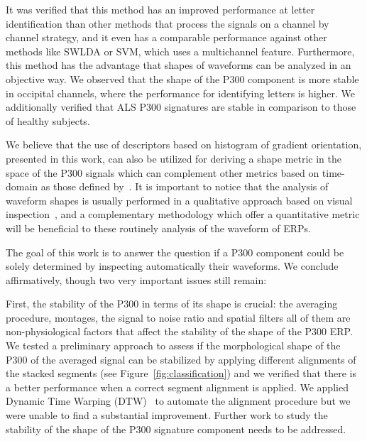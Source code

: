 \documentclass[utf8]{frontiersSCNS} %
\begin{document}

It was verified that this method has an improved performance at letter identification than other methods that process the signals on a channel by channel strategy, and it even has a comparable performance against other methods like SWLDA or SVM, which uses a multichannel feature.
Furthermore, this method has the advantage that shapes of waveforms can be analyzed in an objective way.  We observed that the shape of the P300 component is more stable in occipital channels, where the performance for identifying letters is higher.   We additionally verified that ALS P300 signatures are stable in comparison to those of healthy subjects.


We believe that the use of descriptors based on histogram of gradient orientation, presented in this work, can also be utilized for deriving a shape metric in the space of the P300 signals which can complement other metrics based on time-domain as those defined by~\cite{Mak2012}. It is important to notice that the analysis of waveform shapes is usually performed in a qualitative approach based on visual inspection~\citep{SellersandEmanuelDonchin2006}, and a complementary methodology which offer a quantitative metric will be beneficial to these routinely analysis of the waveform of ERPs.

The goal of this work is to answer the question if a P300 component could be solely determined by inspecting automatically their waveforms.  We conclude affirmatively, though two very important issues still remain:

First, the stability of the P300 in terms of its shape is crucial: the averaging procedure, montages, the signal to noise ratio and spatial filters all of them are non-physiological factors that affect the stability of the shape of the P300 ERP.  We tested a preliminary approach to assess if the morphological shape of the P300 of the averaged signal can be stabilized by applying different alignments of the stacked segments (see Figure~\ref{fig:classification}) and we verified that there is a better performance when a correct segment alignment is applied.  We applied Dynamic Time Warping (DTW)~\citep{Casarotto2005} to automate the alignment procedure but we were unable to find a substantial improvement.  Further work to study the stability of the shape of the P300 signature component needs to be addressed.
\end{document}
